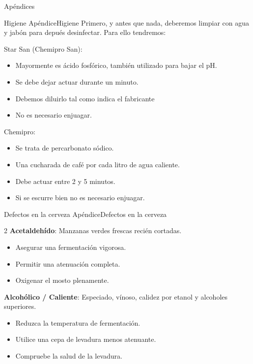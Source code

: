 \begin{frame}{Apéndices}
\protect\hypertarget{apuxe9ndices}{}
\begin{block}{Higiene}
\protect\hypertarget{higiene}{}
ApéndiceHigiene Primero, y antes que nada, deberemos limpiar con agua y
jabón para depués desinfectar. Para ello tendremos:

Star San (Chemipro San):

\begin{itemize}
\item
  Mayormente es ácido fosfórico, también utilizado para bajar el pH.
\item
  Se debe dejar actuar durante un minuto.
\item
  Debemos diluirlo tal como indica el fabricante
\item
  No es necesario enjuagar.
\end{itemize}

Chemipro:

\begin{itemize}
\item
  Se trata de percarbonato sódico.
\item
  Una cucharada de café por cada litro de agua caliente.
\item
  Debe actuar entre 2 y 5 minutos.
\item
  Si se escurre bien no es necesario enjuagar.
\end{itemize}
\end{block}

\begin{block}{Defectos en la cerveza}
\protect\hypertarget{defectos-en-la-cerveza}{}
ApéndiceDefectos en la cerveza

2 \textbf{Acetaldehído}: Manzanas verdes frescas recién cortadas.

\begin{itemize}
\item
  Asegurar una fermentación vigorosa.
\item
  Permitir una atenuación completa.
\item
  Oxigenar el mosto plenamente.
\end{itemize}

\textbf{Alcohólico / Caliente}: Especiado, vínoso, calidez por etanol y
alcoholes superiores.

\begin{itemize}
\item
  Reduzca la temperatura de fermentación.
\item
  Utilice una cepa de levadura menos atenuante.
\item
  Compruebe la salud de la levadura.
\end{itemize}


\end{block}
\end{frame}
